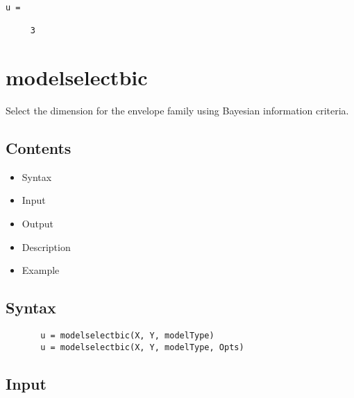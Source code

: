 \documentclass[a4paper,11pt,openany]{memoir}
\begin{document}
\color{lightgray}\ttfamily\begin{verbatim}
u =

     3

\end{verbatim} \rmfamily
\color{black}
    
\newpage


\rmfamily
\color{black}\section{modelselectbic}

\begin{par}
Select the dimension for the envelope family using Bayesian information criteria.
\end{par} \vspace{1em}

\subsection*{Contents}

\begin{itemize}
\setlength{\itemsep}{-1ex}
   \item Syntax
   \item Input
   \item Output
   \item Description
   \item Example
\end{itemize}


\subsection*{Syntax}


\begin{verbatim}       u = modelselectbic(X, Y, modelType)
       u = modelselectbic(X, Y, modelType, Opts)\end{verbatim}
    

\subsection*{Input}
\end{document}
